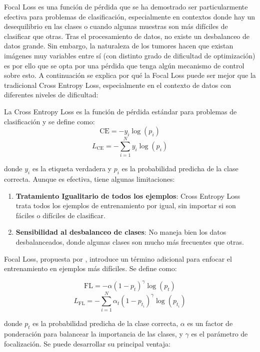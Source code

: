 Focal Loss es una función de pérdida que se ha demostrado ser particularmente efectiva para problemas de clasificación, especialmente en contextos donde hay un desequilibrio en las clases o cuando algunas muestras son más difíciles de clasificar que otras. Tras el procesamiento de datos, no existe un desbalanceo de datos grande. Sin embargo, la naturaleza de los tumores hacen que existan imágenes muy variables entre sí (con distinto grado de dificultad de optimización) es por ello que se opta por una pérdida que tenga algún mecanismo de control sobre esto. A continuación se explica por qué la Focal Loss puede ser mejor que la tradicional Cross Entropy Loss, especialmente en el contexto de datos con diferentes niveles de dificultad:

La Cross Entropy Loss es la función de pérdida estándar para problemas de clasificación y se define como:
$$  {\text{CE}} = - y_i \log(p_i) $$
$$  L_{\text{CE}} = - \sum_{i=1}^N y_i \log(p_i) $$

donde $y_i$ es la etiqueta verdadera y $p_i$ es la probabilidad predicha de la clase correcta. Aunque es efectiva, tiene algunas limitaciones:
\begin{enumerate}
	\item \textbf{Tratamiento Igualitario de todos los ejemplos}: Cross Entropy Loss trata todos los ejemplos de entrenamiento por igual, sin importar si son fáciles o difíciles de clasificar.
	\item \textbf{Sensibilidad al desbalanceo de clases}: No maneja bien los datos desbalanceados, donde algunas clases son mucho más frecuentes que otras.
\end{enumerate}

Focal Loss, propuesta por \cite{lin2017focal}, introduce un término adicional para enfocar el entrenamiento en ejemplos más difíciles. Se define como:

$$ {\text{FL}} = - \alpha (1 - p_t)^\gamma \log(p_t) $$
$$ L_{\text{FL}} = - \sum_{i=1}^N \alpha_t (1 - p_{t_i})^\gamma \log(p_{t_i})$$

donde $p_t$ es la probabilidad predicha de la clase correcta, $\alpha$ es un factor de ponderación para balancear la importancia de las clases, y $\gamma$ es el parámetro de focalización. Se puede desarrollar su principal ventaja:

